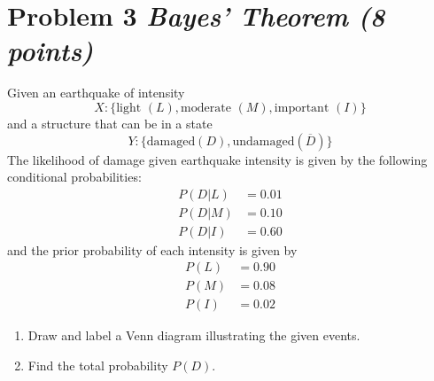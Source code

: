 \documentclass[11pt,twoside]{article}
\newcommand{\pts}[1]{\marginpar{ \small\hspace{0pt} \textit{[#1]} } }
\numberwithin{equation}{section}
\newcommand{\?}{\stackrel{?}{=}}
\newcommand{\fr}{\frac}
\newcommand{\ol}{\overline}
\begin{document}


\section*{Problem 3 \textit{Bayes' Theorem (8 points)}}
Given an earthquake of intensity
\begin{equation}
  \label{eq:10}
  X :  \{\text{light } (L), \text{moderate } (M), \text{important } (I)\}
\end{equation}
and a structure that can be in a state
\begin{equation}
  \label{eq:11}
  Y :   \{\text{damaged} (D), \text{undamaged} (\ol{D})\}
\end{equation}
The likelihood of damage given earthquake intensity is given by the following conditional probabilities:
\begin{align*}
  \label{eq:12}
  P(D|L) &= 0.01 \\
  P(D|M) &= 0.10 \\
  P(D|I) &= 0.60 
  \end{align*}
and the prior probability of each intensity is given by
\begin{align*}
    P(L) &= 0.90 \\
    P(M) &= 0.08 \\
    P(I) &= 0.02 
\end{align*}

\begin{enumerate}[\bf (a)]
\item Draw and label a Venn diagram illustrating the given events. \pts{5}
 \vspace{40ex}

\item Find the total probability $P(D)$. \pts{3}
  \vspace{20ex}
\end{enumerate}
\end{document}
